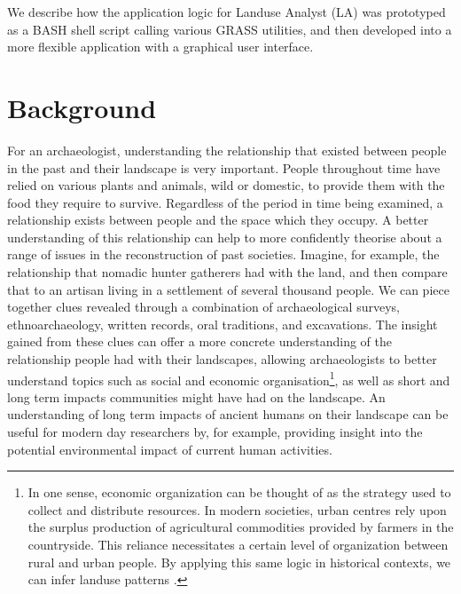 We describe how the application logic for Landuse Analyst (LA) was prototyped as a
BASH shell script calling various GRASS utilities, and then developed into a
more flexible application with a graphical user interface.

\section{Background} \label{sec:Background} For an archaeologist, understanding
the relationship that existed between people in the past and their landscape is
very important.  People throughout time have relied on various plants and
animals, wild or domestic, to provide them with the food they require to
survive.  Regardless of the period in time being examined, a relationship
exists between people and the space which they occupy.  A better understanding
of this relationship can help to more confidently theorise about a range of
issues in the reconstruction of past societies.  Imagine, for example, the
relationship that nomadic hunter gatherers had with the land, and then compare
that to  an artisan living in a settlement of several thousand people.  We can
piece together clues revealed through a combination of archaeological surveys,
ethnoarchaeology, written records, oral traditions, and excavations. The
insight gained from these clues can offer a more concrete understanding of the
relationship people had with their landscapes, allowing archaeologists to
better understand topics such as social and economic organisation\footnote{In
one sense, economic organization can be thought of as the strategy used to
collect and distribute resources.  In modern societies, urban centres rely upon
the surplus production of agricultural commodities provided by farmers in the
countryside.  This reliance necessitates a certain level of organization
between rural and urban people.  By applying this same logic in historical
contexts, we can infer landuse patterns .}, as well as short and long term
impacts communities might have had on the landscape.  An understanding of long
term impacts of ancient humans on their landscape can be useful for modern day
researchers by, for example, providing insight into the potential environmental impact of
current human activities.

